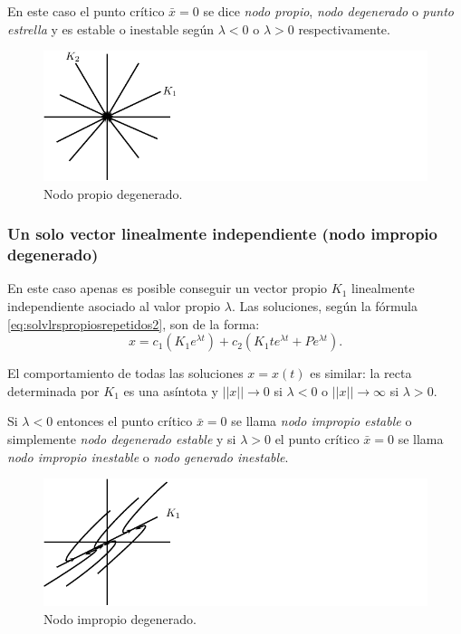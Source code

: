 En este caso el punto crítico $\bar{x} = 0$ se dice \emph{nodo propio}, \emph{nodo degenerado} o \emph{punto estrella} y es estable o inestable según $\lambda < 0$ o $\lambda > 0$ respectivamente.

\begin{figure}[!ht] \centering
    \includegraphics[scale=1.0]{figures/nodopropio.pdf}
    \caption{Nodo propio degenerado.}
	\label{fig:nodopropio}
\end{figure}

\subsubsection{Un solo vector linealmente independiente (nodo impropio degenerado)}

En este caso apenas es posible conseguir un vector propio $K_1$ linealmente independiente asociado al valor propio $\lambda$. Las soluciones, según la fórmula \ref{eq:solvlrspropiosrepetidos2}, son de la forma:
$$ x =c_1(K_1 e^{\lambda t}) + c_2(K_1 t e^{\lambda t} + Pe^{\lambda t}). $$

El comportamiento de todas las soluciones $x = x(t)$ es similar: la recta determinada por $K_1$ es una asíntota y $||x|| \to 0$ si $\lambda < 0$ o $||x|| \to \infty$ si $\lambda > 0$.

Si $\lambda < 0$ entonces el punto crítico $\bar{x} = 0$ se llama \emph{nodo impropio estable} o simplemente \emph{nodo degenerado estable} y si $\lambda > 0$ el punto crítico $\bar{x} = 0$ se llama \emph{nodo impropio inestable} o \emph{nodo generado inestable}.

\begin{figure}[!ht] \centering
    \includegraphics[scale=1.0]{figures/nodoimpropio.pdf}
    \caption{Nodo impropio degenerado.}
	\label{fig:nodoimpropio}
\end{figure}

